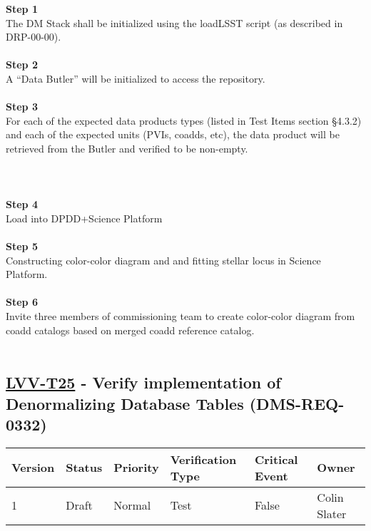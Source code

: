 \textbf{Step 1}\\
The DM Stack shall be initialized using the loadLSST script (as
described in DRP-00-00).\\
~\\
\textbf{Step 2}\\
A ``Data Butler'' will be initialized to access the repository.\\
~\\
\textbf{Step 3}\\
For each of the expected data products types (listed in Test Items
section §4.3.2) and each of the expected units (PVIs, coadds, etc), the
data product will be retrieved from the Butler and verified to be
non-empty.\\
~\\
~\\
~\\
\textbf{Step 4}\\
Load into DPDD+Science Platform\\
~\\
\textbf{Step 5}\\
Constructing color-color diagram and and fitting stellar locus in
Science Platform.\\
~\\
\textbf{Step 6}\\
Invite three members of commissioning team to create color-color diagram
from coadd catalogs based on merged coadd reference catalog.\\
~\\

\hypertarget{lvv-t25---verify-implementation-of-denormalizing-database-tables-dms-req-0332}{%
\subsection{\texorpdfstring{\href{https://jira.lsstcorp.org/secure/Tests.jspa\#/testCase/LVV-T25}{LVV-T25}
- Verify implementation of Denormalizing Database Tables
(DMS-REQ-0332)}{LVV-T25 - Verify implementation of Denormalizing Database Tables (DMS-REQ-0332)}}\label{lvv-t25---verify-implementation-of-denormalizing-database-tables-dms-req-0332}}

\begin{longtable}[]{@{}llllll@{}}
\toprule
Version & Status & Priority & Verification Type & Critical Event &
Owner\tabularnewline
\midrule
\endhead
1 & Draft & Normal & Test & False & Colin Slater\tabularnewline
\bottomrule
\end{longtable}

